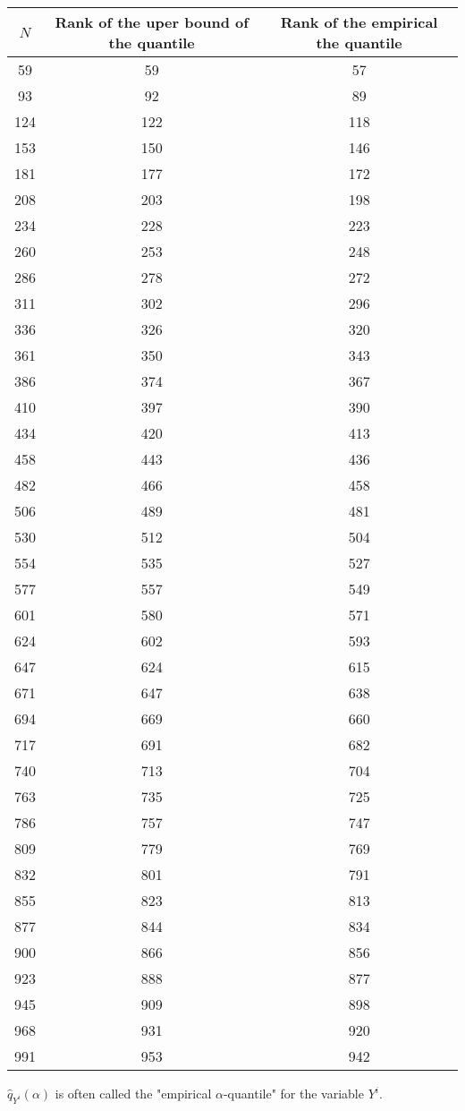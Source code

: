 {  \begin{center}
    \footnotesize
    \begin{tabular}{|c|c|c|}
      \hline
      $N$ & Rank of the uper bound of the quantile & Rank of the empirical the quantile \\
      \hline
      59 & 59 & 57\\
      93 & 92 & 89\\
      124 & 122 & 118\\
      153 & 150 & 146 \\
      181 & 177 & 172 \\
      208 & 203 & 198 \\
      234 & 228 & 223 \\
      260 & 253 & 248 \\
      286 & 278 & 272 \\
      311 & 302 & 296 \\
      336 & 326 & 320 \\
      361 & 350 & 343 \\
      386 & 374 & 367 \\
      410 & 397 & 390 \\
      434 & 420 & 413 \\
      458 & 443 & 436 \\
      482 & 466 & 458 \\
      506 & 489 & 481 \\
      530 & 512 & 504 \\
      554 & 535 & 527 \\
      577 & 557 & 549 \\
      601 & 580 & 571 \\
      624 & 602 & 593 \\
      647 & 624 & 615 \\
      671 & 647 & 638 \\
      694 & 669 & 660 \\
      717 & 691 & 682 \\
      740 & 713 & 704 \\
      763 & 735 & 725 \\
      786 & 757 & 747 \\
      809 & 779 & 769 \\
      832 & 801 & 791 \\
      855 & 823 & 813 \\
      877 & 844 & 834 \\
      900 & 866 & 856 \\
      923 & 888 & 877 \\
      945 & 909 & 898 \\
      968 & 931 & 920 \\
      991 & 953 & 942 \\
      \hline
    \end{tabular}
  \end{center}

}
{
  $\widehat{q}_{Y^i}(\alpha)$ is often called the "empirical $\alpha$-quantile" for the variable ${Y^i}$.
}


